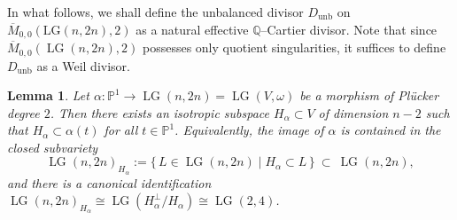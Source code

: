 \documentclass[10pt]{amsart}
\newtheorem{lemma}[theorem]{Lemma}
\theoremstyle{definition}
\newcommand{\LG}{\operatorname{LG}}
\DeclareMathOperator{\unb}{unb}
\newcommand{\PP}{\mathbb{P}}
\theoremstyle{plain} %
\begin{document}




In what follows, we shall define the unbalanced divisor $D_{\mathrm{unb}}$ on $\overline{M}_{0,0}(\mathrm{LG}(n,2n),2)$ as a natural effective $\mathbb{Q}$--Cartier divisor. 
Note that since $\overline{M}_{0,0}(\LG(n,2n),2)$ possesses only quotient singularities, it suffices to define $D_{\unb}$ as a Weil divisor.


\begin{lemma}\label{lem:rank-two-factorization}
Let $\alpha\colon\PP^1\to \LG(n,2n) = \LG(V,\omega)$ be a morphism of Pl\"ucker degree $2$. Then there exists an isotropic subspace
$H_{\alpha}\subset V$ of dimension $n-2$ such that $H_{\alpha}\subset \alpha(t)$ for all $t\in \PP^1$. Equivalently, the image of $\alpha$
is contained in the closed subvariety
\[
\LG(n,2n)_{H_{\alpha}}:=\{\,L\in \LG(n,2n)\mid H_{\alpha}\subset L\,\}\ \subset\ \LG(n,2n),
\]
and there is a canonical identification $\LG(n,2n)_{H_{\alpha}} \cong \LG(H_{\alpha}^\perp/H_{\alpha}) \cong \LG(2,4)$.
\end{lemma}
\end{document}
